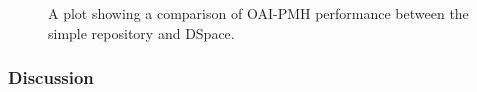 \begin{figure}
 \centering
 \framebox[\textwidth]{%

 }
\caption[Comparison of OAI-PMH performance]{A plot showing a comparison of OAI-PMH performance between the simple repository and DSpace.}
 \label{fig:experimentation:performance:comparision:oaipmh}
\end{figure}

% 
\begin{comment}
\begin{figure}
 \centering
 \framebox[\textwidth]{%

 }
\caption[OAI-PMH ListIdentifiers\index{OAI-PMH!Verbs!ListIdentifiers} performance comparison]{OAI-PMH ListIdentifiers\index{OAI-PMH!Verbs!ListIdentifiers} performance comparison.}
 \label{fig:experimentation:performance:comparision:oaipmh-listidentifiers}
\end{figure}

\begin{figure}
 \centering
 \framebox[\textwidth]{%

 }
\caption[OAI-PMH ListRecords\index{OAI-PMH!Verbs!ListRecords} performance comparison]{OAI-PMH ListRecords\index{OAI-PMH!Verbs!ListRecords} performance comparison.}
 \label{fig:experimentation:performance:comparision:oaipmh-listrecords}
\end{figure}

\begin{figure}
 \centering
 \framebox[\textwidth]{%

 }
\caption[OAI-PMH ListSets\index{OAI-PMH!Verbs!ListSets} performance comparison]{OAI-PMH ListSets\index{OAI-PMH!Verbs!ListSets} performance comparison.}
 \label{fig:experimentation:performance:comparision:oaipmh-listsets}
\end{figure}
\end{comment}

\subsubsection{Discussion}
\label{sec:evaluation:performance:performance-comparison:discussion}


